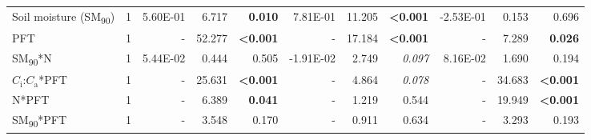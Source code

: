 \begin{landscape}
\begin{table}
{\begin{tabular}{p{3.75cm}p{0.5cm}p{1.75cm}p{1.5cm}p{1.5cm}p{1.75cm}p{1.5cm}p{1.5cm}p{1.75cm}p{1.5cm}p{1.5cm}}
            Soil moisture (SM\textsubscript{90}) & \multicolumn{1}{r}{1}
            & \multicolumn{1}{r}{5.60E-01}      & \multicolumn{1}{r}{6.717}         & \multicolumn{1}{r}{\textbf{0.010}}
            & \multicolumn{1}{r}{7.81E-01}      & \multicolumn{1}{r}{11.205}        & \multicolumn{1}{r}{\textbf{<0.001}}
            & \multicolumn{1}{r}{-2.53E-01}     & \multicolumn{1}{r}{0.153}         & \multicolumn{1}{r}{0.696} 
            \\

            PFT & \multicolumn{1}{r}{1}
            & \multicolumn{1}{r}{-}             & \multicolumn{1}{r}{52.277}        & \multicolumn{1}{r}{\textbf{<0.001}}
            & \multicolumn{1}{r}{-}             & \multicolumn{1}{r}{17.184}        & \multicolumn{1}{r}{\textbf{<0.001}}
            & \multicolumn{1}{r}{-}             & \multicolumn{1}{r}{7.289}         & \multicolumn{1}{r}{\textbf{0.026}} 
            \\

            SM\textsubscript{90}*N & \multicolumn{1}{r}{1}
            & \multicolumn{1}{r}{5.44E-02}     & \multicolumn{1}{r}{0.444}         & \multicolumn{1}{r}{0.505}
            & \multicolumn{1}{r}{-1.91E-02}     & \multicolumn{1}{r}{2.749}        & \multicolumn{1}{r}{\textit{0.097}}
            & \multicolumn{1}{r}{8.16E-02}      & \multicolumn{1}{r}{1.690}        & \multicolumn{1}{r}{0.194} 
            \\

            $C_\mathrm{i}$:$C_\mathrm{a}$*PFT & \multicolumn{1}{r}{1}
            & \multicolumn{1}{r}{-}             & \multicolumn{1}{r}{25.631}        & \multicolumn{1}{r}{\textbf{<0.001}}
            & \multicolumn{1}{r}{-}             & \multicolumn{1}{r}{4.864}         & \multicolumn{1}{r}{\textit{ 0.078}}
            & \multicolumn{1}{r}{-}             & \multicolumn{1}{r}{34.683}        & \multicolumn{1}{r}{\textbf{<0.001}} 
            \\

            N*PFT & \multicolumn{1}{r}{1}
            & \multicolumn{1}{r}{-}             & \multicolumn{1}{r}{6.389}         & \multicolumn{1}{r}{\textbf{0.041}}
            & \multicolumn{1}{r}{-}             & \multicolumn{1}{r}{1.219}         & \multicolumn{1}{r}{0.544}
            & \multicolumn{1}{r}{-}             & \multicolumn{1}{r}{19.949}         & \multicolumn{1}{r}{\textbf{<0.001}}
            \\

            SM\textsubscript{90}*PFT & \multicolumn{1}{r}{1}
            & \multicolumn{1}{r}{-}             & \multicolumn{1}{r}{3.548}         & \multicolumn{1}{r}{0.170}
            & \multicolumn{1}{r}{-}             & \multicolumn{1}{r}{0.911}         & \multicolumn{1}{r}{0.634}
            & \multicolumn{1}{r}{-}             & \multicolumn{1}{r}{3.293}         & \multicolumn{1}{r}{0.193} 
            \\


\end{tabular}}
\end{table}
\end{landscape}
